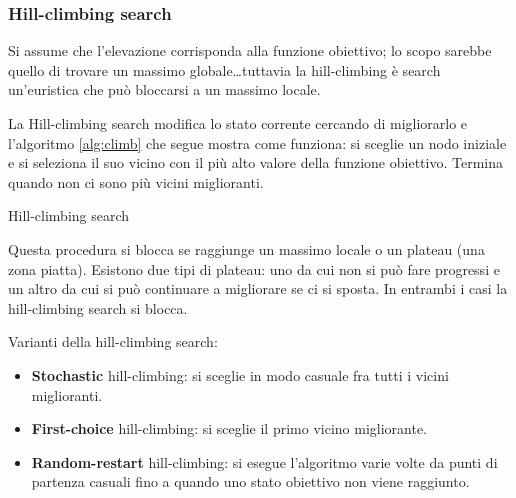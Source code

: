 \subsubsection{Hill-climbing search}

Si assume che l'elevazione corrisponda alla funzione obiettivo; lo scopo
sarebbe quello di trovare un massimo globale\dots tuttavia la hill-climbing
è search un'euristica che può bloccarsi a un massimo locale.

La Hill-climbing search modifica lo stato corrente cercando di migliorarlo e
l'algoritmo \ref{alg:climb} che segue mostra come funziona: si sceglie un nodo
iniziale e si seleziona il suo vicino con il più alto valore della funzione
obiettivo. Termina quando non ci sono più vicini miglioranti.

\begin{algorithm}
    \caption{Hill-climbing search}
    \label{alg:climb}
    \begin{algorithmic}[1]
         
            \Loop
              \EndIf
            \EndLoop
        \EndProcedure
    \end{algorithmic}
\end{algorithm}

Questa procedura si blocca se raggiunge un massimo locale o un plateau (una zona
piatta).
Esistono due tipi di plateau: uno da cui non si può fare progressi e un
altro da cui si può continuare a migliorare se ci si sposta. In entrambi i casi
la hill-climbing search si blocca.

Varianti della hill-climbing search:

\begin{itemize}
 \item \textbf{Stochastic} hill-climbing: si sceglie in modo casuale fra
tutti i vicini miglioranti.
 \item \textbf{First-choice} hill-climbing: si sceglie il primo vicino
migliorante.
 \item \textbf{Random-restart} hill-climbing: si esegue l'algoritmo varie volte
da punti di partenza casuali fino a quando uno stato obiettivo non viene
raggiunto.
\end{itemize}

